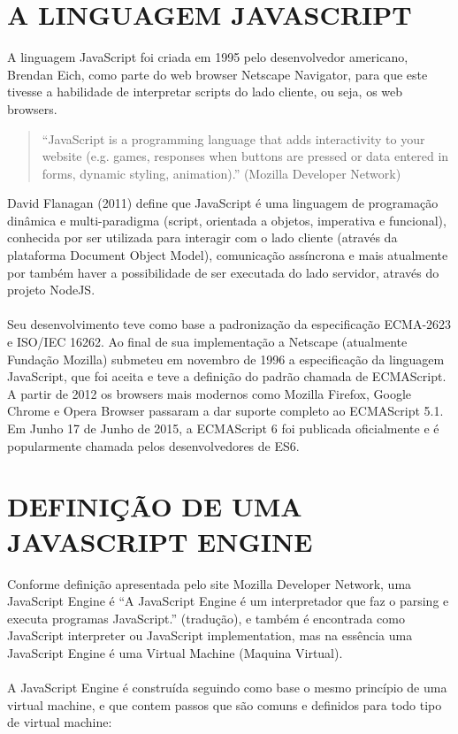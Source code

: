 \documentclass[12pt,a4paper]{article}
\begin{document}
\section{A LINGUAGEM JAVASCRIPT}
\label{sec:section4}

A linguagem JavaScript foi criada em 1995 pelo desenvolvedor americano, Brendan Eich, como parte do web browser Netscape Navigator, para que este tivesse a habilidade de interpretar scripts do lado cliente, ou seja, os web browsers. \\

\begin{quote}
“JavaScript is a programming language that adds interactivity to your
website (e.g. games, responses when buttons are pressed or data entered in
forms, dynamic styling, animation).” (Mozilla Developer Network)
\end{quote}

David Flanagan (2011) define que JavaScript é uma linguagem de programação dinâmica e multi-paradigma (script, orientada a objetos, imperativa e funcional), conhecida por ser utilizada para interagir com o lado cliente (através da plataforma Document Object Model), comunicação assíncrona e mais atualmente por também haver a possibilidade de ser executada do lado servidor, através do projeto NodeJS. \\
\\
Seu desenvolvimento teve como base a padronização da especificação ECMA-2623 e
ISO/IEC 16262. Ao final de sua implementação a Netscape (atualmente Fundação Mozilla) submeteu em novembro de 1996 a especificação da linguagem JavaScript, que foi aceita e teve a definição do padrão chamada de ECMAScript. A partir de 2012 os browsers mais modernos como Mozilla Firefox, Google Chrome e Opera Browser passaram a dar suporte completo ao ECMAScript 5.1. Em Junho 17 de Junho de 2015, a ECMAScript 6 foi publicada oficialmente e é popularmente chamada pelos desenvolvedores de ES6.

\section{DEFINIÇÃO DE UMA JAVASCRIPT ENGINE}
\label{sec:section5}

Conforme definição apresentada pelo site Mozilla Developer Network, uma JavaScript Engine é “A JavaScript Engine é um interpretador que faz o parsing e executa programas JavaScript.” (tradução), e também é encontrada como JavaScript interpreter ou JavaScript implementation, mas na essência uma JavaScript Engine é uma Virtual Machine (Maquina Virtual). \\
\\
A JavaScript Engine é construída seguindo como base o mesmo princípio de uma virtual machine, e que contem passos que são comuns e definidos para todo tipo de virtual machine:
\end{document}
